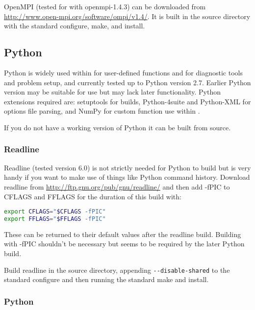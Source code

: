 OpenMPI (tested for \fluidity with openmpi-1.4.3) can be downloaded from
\url{http://www.open-mpi.org/software/ompi/v1.4/}. It is built in the source
directory with the standard configure, make, and install.

\subsection{Python}
\label{sec:required_libraries_python}

Python is widely used within \fluidity for user-defined functions and for
diagnostic tools and problem setup, and currently tested up to Python version
2.7. Earlier Python version may be suitable for use but may lack later
functionality. Python extensions required are: setuptools for \fluidity builds,
Python-4suite and Python-XML for options file parsing, and NumPy for custom
function use within \fluidity.

If you do not have a working version of Python it can be built from source. 

\subsubsection{Readline}
\label{sec:required_libraries_python_readline}

Readline (tested version 6.0) is not strictly needed for Python to build but is
very handy if you want to make use of things like Python command history.
Download readline from \url{http://ftp.gnu.org/pub/gnu/readline/} and then add
-fPIC to CFLAGS and FFLAGS for the duration of this build with:

\begin{lstlisting}[language=bash]
export CFLAGS="$CFLAGS -fPIC"
export FFLAGS="$FFLAGS -fPIC"
\end{lstlisting}

These can be returned to their default values after the readline build.
Building with -fPIC shouldn't be necessary but seems to be required by the
later Python build.

Build readline in the source directory, appending
\lstinline[language=bash]+--disable-shared+ to the standard configure and then
running the standard make and install.

\subsubsection{Python}
\label{sec:required_libraries_python_python}

